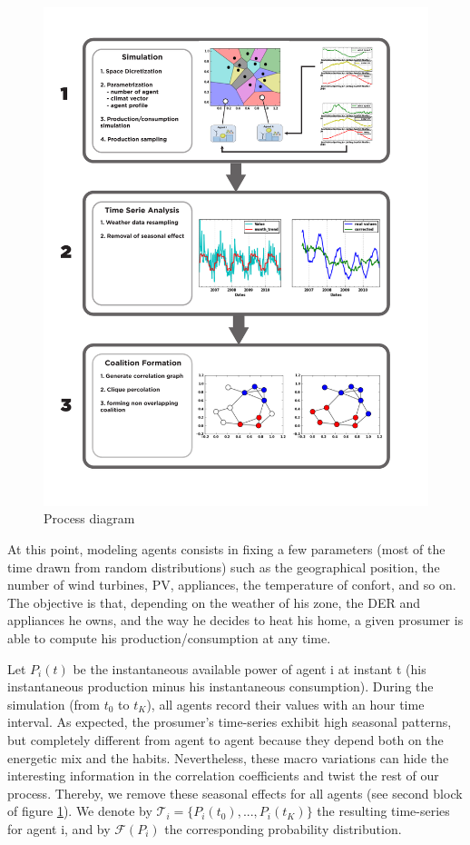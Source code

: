 \documentclass[conference]{IEEEtran}
\begin{document}
\begin{center}
\begin{figure}
\includegraphics[scale=0.43]{figure2/Fig2}
\caption{Process diagram}
\label{Fig1}
\end{figure}
\end{center}

At this point, modeling agents consists in fixing a few parameters (most of the time drawn from random distributions) such as the geographical position, the number of wind turbines, PV, appliances, the temperature of confort, and so on. The objective is that, depending on the weather of his zone, the DER and appliances he owns, and the way he decides to heat his home, a given prosumer is able to compute his production/consumption at any time. 

Let $ P_{i}(t) $ be the instantaneous available power of agent i at instant t (his instantaneous production minus his instantaneous consumption). During the simulation (from $t_{0} $ to $ t_{K} $), all agents record their values with an hour time interval. As expected, the prosumer's time-series exhibit high seasonal patterns, but completely different from agent to agent because they depend both on the energetic mix and the habits. Nevertheless, these macro variations can hide the interesting information in the correlation coefficients and twist the rest of our process. Thereby, we remove these seasonal effects for all agents (see second block of figure \ref{Fig1}). We denote by $ \mathcal{T}_{i} = \{ P_{i}(t_{0}),...,P_{i}(t_{K}) \} $ the resulting time-series for  agent i, and by $ \mathcal{F}(P_{i}) $ the corresponding probability distribution.
\end{document}
